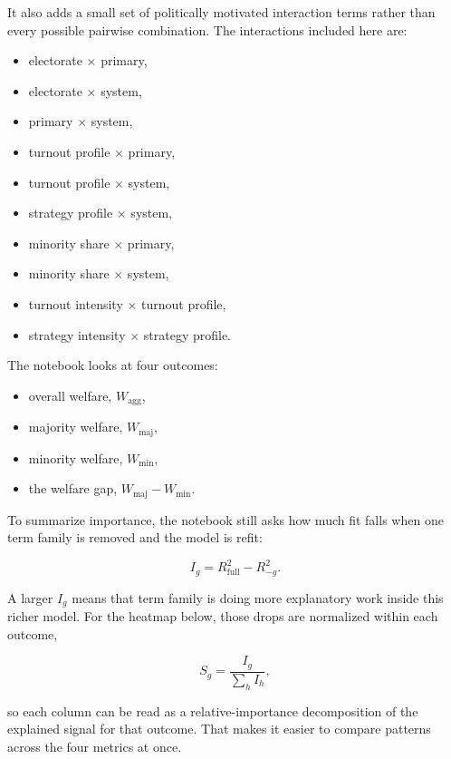 \documentclass[11pt]{article}
\providecommand{\tightlist}{%
      \setlength{\itemsep}{0pt}\setlength{\parskip}{0pt}}
\begin{document}
It also adds a small set of politically motivated interaction terms
rather than every possible pairwise combination. The interactions
included here are:

\begin{itemize}
\tightlist
\item
  electorate \(\times\) primary,
\item
  electorate \(\times\) system,
\item
  primary \(\times\) system,
\item
  turnout profile \(\times\) primary,
\item
  turnout profile \(\times\) system,
\item
  strategy profile \(\times\) system,
\item
  minority share \(\times\) primary,
\item
  minority share \(\times\) system,
\item
  turnout intensity \(\times\) turnout profile,
\item
  strategy intensity \(\times\) strategy profile.
\end{itemize}

The notebook looks at four outcomes:

\begin{itemize}
\tightlist
\item
  overall welfare, \(W_{\mathrm{agg}}\),
\item
  majority welfare, \(W_{\mathrm{maj}}\),
\item
  minority welfare, \(W_{\mathrm{min}}\),
\item
  the welfare gap, \(W_{\mathrm{maj}} - W_{\mathrm{min}}\).
\end{itemize}

To summarize importance, the notebook still asks how much fit falls when
one term family is removed and the model is refit:

\[
I_g = R^2_{\mathrm{full}} - R^2_{-g}.
\]

A larger \(I_g\) means that term family is doing more explanatory work
inside this richer model. For the heatmap below, those drops are
normalized within each outcome,

\[
S_g = \frac{I_g}{\sum_h I_h},
\]

so each column can be read as a relative-importance decomposition of the
explained signal for that outcome. That makes it easier to compare
patterns across the four metrics at once.
\end{document}
